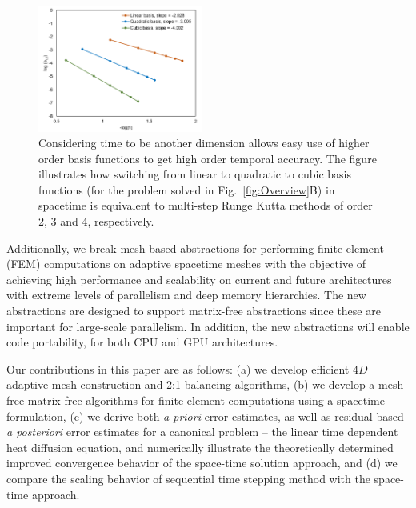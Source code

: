\begin{figure}%
\vspace{-0.2in}
  \begin{center}
    \includegraphics[trim={0 0 0 0},clip,width=0.48\textwidth]{figs/cnv-NL-final-time}
  \end{center}
   \vspace{-0.1in}
   \caption{\label{fig:ST_conv} \small Considering time to be another dimension allows easy use of higher order basis functions to get high order temporal accuracy. The figure illustrates how switching from linear to quadratic to cubic basis functions (for the problem solved in  Fig.~\ref{fig:Overview}B) in spacetime is equivalent to multi-step Runge Kutta methods of order 2, 3 and 4, respectively. }
   \vspace{-0.1in}
\end{figure}

\par Additionally, we break mesh-based abstractions for performing finite element (FEM) computations on adaptive spacetime meshes with the objective of achieving high performance and scalability on current and future architectures with extreme levels of parallelism and deep memory hierarchies. The new abstractions are designed to support matrix-free abstractions since these are important for large-scale parallelism. In addition, the new abstractions will enable code portability, for both CPU and GPU architectures. 

Our contributions in this paper are as follows: 
(a) we develop efficient $4D$ adaptive mesh construction and 2:1 balancing algorithms, 
(b) we develop a mesh-free matrix-free algorithms for finite element computations using a spacetime formulation, 
(c)  we derive both {\it a priori} error estimates, as well as residual based {\it a posteriori} error estimates for a canonical problem -- the linear time dependent heat diffusion equation, and numerically illustrate the theoretically determined improved convergence behavior of the space-time solution approach, and 
(d) we compare the scaling behavior of sequential time stepping method with the space-time approach. %

